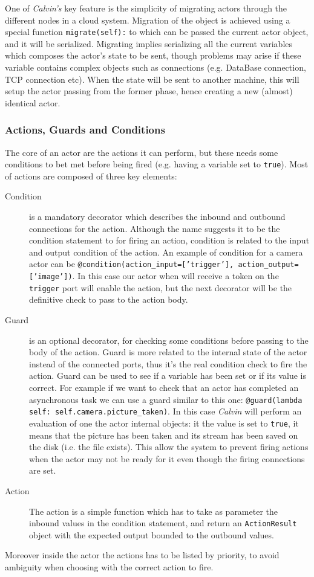 One of \textit{Calvin's} key feature is the simplicity of migrating actors through the
different nodes in a cloud system. Migration of the object is achieved using a special function
\texttt{migrate(self):} to which can be passed the current actor object, and it will be serialized.
Migrating implies serializing all the current variables which composes the actor's state to be sent, though
problems may arise if these variable contains complex objects such as connections (e.g. DataBase connection,
TCP connection etc). When the state will be sent to another machine, this will setup the actor
passing from the former phase, hence creating a new (almost) identical actor.

\subsubsection{Actions, Guards and Conditions}

The core of an actor are the actions it can perform, but these needs some conditions to bet met
before being fired (e.g. having a variable set to \texttt{true}). Most of actions are composed of three
key elements:

\begin{description}
    \item[Condition] is a mandatory decorator which describes the inbound and outbound connections for the action.
    Although the name suggests it to be the condition statement to for firing an action, condition is related to the
    input and output condition of the action. An example of condition for a camera actor can be
    \texttt{@condition(action\_input=['trigger'], action\_output=['image'])}. In this case our actor when will receive a token
    on the \texttt{trigger} port will enable the action, but the next decorator will be the definitive check to pass to the action
    body.
    \item[Guard]  is an optional decorator, for checking some conditions before passing to the body of the action.
    Guard is more related to the internal state of the actor instead of the connected ports, thus it's the real condition
    check to fire the action. Guard can be used to see if a variable has been set or if its value is correct. For example
    if we want to check that an actor has completed an asynchronous task we can use a guard similar to this one:
    \texttt{@guard(lambda self: self.camera.picture\_taken)}. In this case \textit{Calvin} will perform an evaluation
    of one the actor internal objects: it the value is set to \texttt{true}, it means that the picture has been taken and
    its stream has been saved on the disk (i.e. the file exists). This allow the system to prevent firing actions
    when the actor may not be ready for it even though the firing connections are set.
    \item[Action] The action is a simple function which has to take as parameter the inbound values in the condition
    statement, and return an \texttt{ActionResult} object with the expected output bounded to the outbound values.

\end{description}

Moreover inside the actor the actions has to be listed by priority, to avoid ambiguity
when choosing with the correct action to fire.

